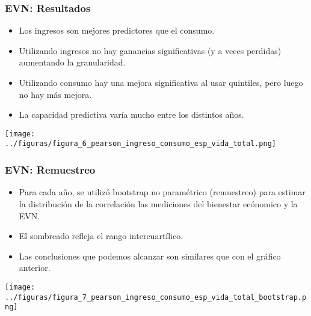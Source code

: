 \documentclass[10pt,mathserif]{beamer}%
\begin{document}
\begin{frame}
    \frametitle{EVN: Resultados}
    \begin{multicols}{2}
        \begin{minipage}{\linewidth}
            \begin{itemize}
                \item Los ingresos son mejores predictores que el consumo.
                \item Utilizando ingresos no hay ganancias significativas (y a veces perdidas) aumentando la granularidad.
                \item Utilizando consumo hay una mejora significativa al usar quintiles, pero luego no hay más mejora.
                \item La capacidad predictiva varía mucho entre los distintos años.
            \end{itemize}\end{minipage}
        \begin{minipage}{\linewidth}
            \centering
            \texttt{[image: ../figuras/figura\_6\_pearson\_ingreso\_consumo\_esp\_vida\_total.png]} %
        \end{minipage}

    \end{multicols}
\end{frame}

\begin{frame}
    \frametitle{EVN: Remuestreo}
    \begin{multicols}{2}
        \begin{minipage}{\linewidth}
            \begin{itemize}
                \item Para cada año, se utilizó bootstrap no paramétrico (remuestreo) para estimar la distribución de la correlación las mediciones del bienestar ecónomico y la EVN.
            
                \item El sombreado refleja el rango intercuartílico. 

                \item Las conclusiones que podemos alcanzar son similares que con el gráfico anterior.
            \end{itemize}\end{minipage}
        \begin{minipage}{\linewidth}
            \centering
            \texttt{[image: ../figuras/figura\_7\_pearson\_ingreso\_consumo\_esp\_vida\_total\_bootstrap.png]} %
        \end{minipage}

    \end{multicols}

\end{frame}
\end{document}
